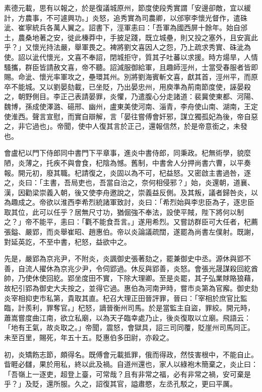 \begin{pinyinscope}
 素德元載，思有以報之，於是復議城原州，節度使段秀實謂「安邊卻敵，宜以緩計，方農事，不可遽興功。」炎怒，追秀實為司農卿，以邠寧李懷光督作，遣硃泚、崔寧統兵各萬人翼之。詔書下，涇軍恚曰：「吾軍為國西屏十餘年。始自邠土，農桑地著之安，徙此榛莽中，手披足踐，既立城壘，則又投之塞外，且安寘此乎？」又懷光持法嚴，舉軍畏之。裨將劉文喜因人之怨，乃上疏求秀實、硃泚為使。詔以泚代懷光，文喜不奉詔，閉城拒守，質其子吐蕃以求援。時方煬旱，人情騷攜，群臣皆請赦文喜，帝不聽。詔減服御給軍，且趣師涇州，士當受春服者皆即賜。命泚、懷光率軍攻之，壘環其州。別將劉海賓斬文喜，獻其首，涇州平，而原卒不能城。又以劉晏劾載，已坐貶，乃出晏忠州，用庾準為荊南節度使，誣晏殺之，朝野側目。李正己表請晏罪，炎懼，乃遣腹心分走諸道：裴冀使東都、河陽、魏博，孫成使澤潞、礠邢、幽州，盧東美使河南、淄青，李舟使山南、湖南，王定使淮西。聲言宣慰，而實自辯解，言「晏往嘗傅會奸邪，謀立獨孤妃為後，帝自惡之，非它過也」。帝聞，使中人復其言於正己，還報信然，於是帝意銜之，未發也。



 會盧杞以門下侍郎同中書門下平章事，進炎中書侍郎，同秉政。杞無術學，貌麼陋，炎薄之，托疾不與會食，杞陰為憾。舊制，中書舍人分押尚書六曹，以平奏報。開元初，廢其職。杞請復之，炎固以為不可，杞益怒。又密啟主書過咎，逐之，炎曰：「主書，吾局吏也，吾當自治之，奈何相侵邪？」始，炎還朝，道襄、漢，因勸梁崇義入朝，後又使李舟邀說之，崇義益反側。及其叛，議者歸咎炎，以為趣成之。帝欲以淮西李希烈統諸軍致討，炎曰：「希烈始與李忠臣為子，逐忠臣取其位，此可以任乎？居無尺寸功，猶倔強不奉法，設使平賊，陛下將何以制之？」帝不能平，恚曰：「氍不能食吾言。」遂用希烈。又嘗訪群臣可大任者，杞薦張鎰、嚴郢，而炎舉崔昭、趙惠伯。帝以炎論議疏闊，遂罷為尚書左僕射。既謝，對延英訖，不至中書，杞怒，益欲中之。



 先是，嚴郢為京兆尹，不附炎，炎諷御史張著劾之，罷兼御史中丞。源休與郢不善，自流人擢休為京兆少尹，令伺郢過。休反與郢善，炎怒。會張光晟謀殺回紇酋帥，乃使休使回紇。郢坐度田不實，下除大理卿。至是炎罷，其子弘業賕賂狼藉，故杞引郢為御史大夫按之，並得它過。惠伯為河南尹時，嘗市炎第為官廨。御史劾炎宰相抑吏市私第，貴取其直。杞召大理正田晉評罪，晉曰：「宰相於庶官比監臨，計羨利，罪奪官。」杞怒，謫晉衡州司馬。於是當監主自盜，罪絞。開元時，蕭嵩嘗度曲江南，欲立私廟，以為天子臨幸處乃止，後炎復取以立廟。飛語云：「地有王氣，故炎取之。」帝聞，震怒，會獄具，詔三司同覆，貶崖州司馬同正。未至百里，賜死，年五十五。貶惠伯多田尉，亦殺之。



 初，炎矯飭志節，頗得名。既傅會元載抵罪，俄而得政，然忮害根中，不能自止。眥睚必讎，果於用私，終以此及禍。自道州還也，家人以綠袍木簡棄之，炎止曰：「吾嶺上一逐吏，超登上臺，可常哉？且有非常之福，必有非常之禍，安可棄是乎？」及貶，還所服。久之，詔復其官，謚肅愍，左丞孔駁之，更曰平厲。




\end{pinyinscope}
